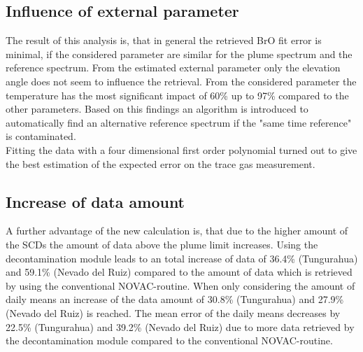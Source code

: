 \documentclass  [
  paper    = a4,
  BCOR     = 10mm,
  twoside,
  fontsize = 12pt,
  fleqn,
  toc      = bibnumbered,
  toc      = listofnumbered,
  numbers  = noendperiod,
  headings = normal,
  listof   = leveldown,
  version  = 3.03
]                                       {scrreprt}
\begin{document}
	\subsection*{Influence of external parameter} 
	The result of this analysis is, that in general the retrieved BrO fit error is minimal, if the considered parameter are similar for the plume spectrum and the reference spectrum. From the estimated external parameter only the elevation angle does not seem to influence the retrieval. From the considered parameter the temperature has the most significant impact of 60\% up to 97\% compared to the other parameters.
	Based on this findings an algorithm is introduced to automatically find an alternative reference spectrum if the "same time reference" is contaminated.\\
	Fitting the data with a four dimensional first order polynomial turned out to give the best estimation of the expected error on the trace gas measurement.
	\subsection*{Increase of data amount} 
	A further advantage of the new calculation is, that due to the higher amount of the  SCDs the amount of data above the plume limit increases. Using the decontamination module leads to an total increase of data of 36.4\% (Tungurahua) and 59.1\% (Nevado del Ruiz) compared to the amount of data which is retrieved by using the conventional NOVAC-routine. When only considering the amount of daily means an increase of the data amount of 30.8\% (Tungurahua) and 27.9\% (Nevado del Ruiz) is reached. The mean error of the daily means decreases by 22.5\% (Tungurahua) and 39.2\% (Nevado del Ruiz) due to more data retrieved by the decontamination module compared to the conventional NOVAC-routine.
\end{document}
